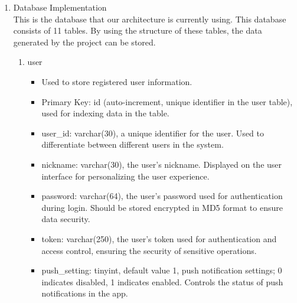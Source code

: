 \begin{enumerate}
                              \item Database Implementation\\
                    This is the database that our architecture is currently using. This database consists of 11 tables. By using the structure of these tables, the data generated by the project can be stored.\\
                    \begin{enumerate}
                        \item user
                              \begin{itemize}
                                  \item Used to store registered user information.
                                  \item Primary Key: id (auto-increment, unique identifier in the user table), used for indexing data in the table.
                                  \item user\_id: varchar(30), a unique identifier for the user. Used to differentiate between different users in the system.
                                  \item nickname: varchar(30), the user's nickname. Displayed on the user interface for personalizing the user experience.
                                  \item password: varchar(64), the user's password used for authentication during login. Should be stored encrypted in MD5 format to ensure data security.
                                  \item token: varchar(250), the user's token used for authentication and access control, ensuring the security of sensitive operations.
                                  \item push\_setting: tinyint, default value 1, push notification settings; 0 indicates disabled, 1 indicates enabled. Controls the status of push notifications in the app.\\
                              \end{itemize}


\end{enumerate}
\end{enumerate}
